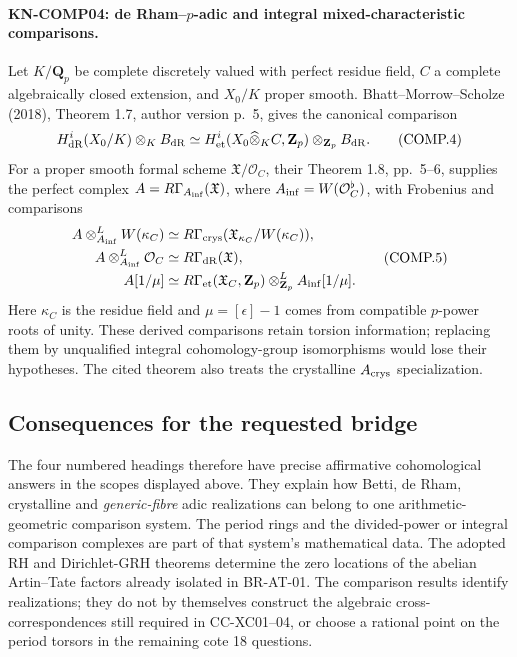 \paragraph{KN-COMP04: de Rham--\texorpdfstring{$p$}{p}-adic and
integral mixed-characteristic comparisons.}
Let $K/\mathbf Q_p$ be complete discretely valued with perfect
residue field, $C$ a complete algebraically closed extension, and
$X_0/K$ proper smooth.  Bhatt--Morrow--Scholze (2018), Theorem 1.7,
author version p.~5, gives the canonical comparison
\[
 H^i_{\rm dR}(X_0/K)\otimes_K B_{\rm dR}
    \simeq H^i_{\rm et}(X_0\widehat\otimes_K C,\mathbf Z_p)
                    \otimes_{\mathbf Z_p}B_{\rm dR}.
 \tag{COMP.4}
\]
For a proper smooth formal scheme $\mathfrak X/\mathcal O_C$, their
Theorem 1.8, pp.~5--6, supplies the perfect complex
$A=R\Gamma_{A_{\rm inf}}(\mathfrak X)$, where
$A_{\rm inf}=W(\mathcal O_C^\flat)$, with Frobenius and comparisons
\[
\begin{aligned}
 A\otimes^{L}_{A_{\rm inf}}W(\kappa_C)
   &\simeq R\Gamma_{\rm crys}(\mathfrak X_{\kappa_C}/W(\kappa_C)),\\
 A\otimes^{L}_{A_{\rm inf}}\mathcal O_C
   &\simeq R\Gamma_{\rm dR}(\mathfrak X),\\
 A[1/\mu]&\simeq
 R\Gamma_{\rm et}(\mathfrak X_C,\mathbf Z_p)
       \otimes^L_{\mathbf Z_p}A_{\rm inf}[1/\mu].
\end{aligned}
 \tag{COMP.5}
\]
Here $\kappa_C$ is the residue field and
$\mu=[\epsilon]-1$ comes from compatible $p$-power roots of unity.
These derived comparisons retain torsion information; replacing them
by unqualified integral cohomology-group isomorphisms would lose
their hypotheses.  The cited theorem also treats the crystalline
$A_{\rm crys}$ specialization.

\subsection{Consequences for the requested bridge}
The four numbered headings therefore have precise affirmative
cohomological answers in the scopes displayed above.  They explain
how Betti, de Rham, crystalline and \emph{generic-fibre} adic
realizations can belong to one arithmetic-geometric comparison
system.  The period rings and the divided-power or integral
comparison complexes are part of that system's mathematical data.
The adopted RH and Dirichlet-GRH theorems determine the zero locations
of the abelian Artin--Tate factors already isolated in BR-AT-01.
The comparison results identify realizations; they do not by
themselves construct the algebraic cross-correspondences still
required in CC-XC01--04, or choose a rational point on the period
torsors in the remaining cote 18 questions.

